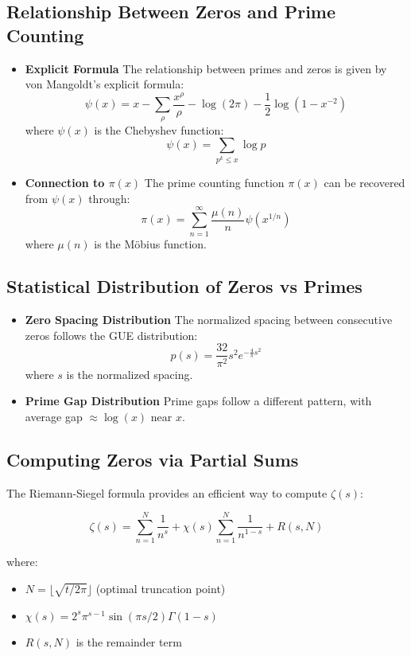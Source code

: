 \documentclass{article}
\begin{document}
\subsection*{Relationship Between Zeros and Prime Counting}

\begin{itemize}
\item \textbf{Explicit Formula}
The relationship between primes and zeros is given by von Mangoldt's explicit formula:
\[ \psi(x) = x - \sum_{\rho} \frac{x^{\rho}}{\rho} - \log(2\pi) - \frac{1}{2}\log(1-x^{-2}) \]
where $\psi(x)$ is the Chebyshev function:
\[ \psi(x) = \sum_{p^k \leq x} \log p \]

\item \textbf{Connection to $\pi(x)$}
The prime counting function $\pi(x)$ can be recovered from $\psi(x)$ through:
\[ \pi(x) = \sum_{n=1}^{\infty} \frac{\mu(n)}{n} \psi(x^{1/n}) \]
where $\mu(n)$ is the Möbius function.
\end{itemize}

\subsection*{Statistical Distribution of Zeros vs Primes}

\begin{itemize}
\item \textbf{Zero Spacing Distribution}
The normalized spacing between consecutive zeros follows the GUE distribution:
\[ p(s) = \frac{32}{\pi^2}s^2e^{-\frac{4}{\pi}s^2} \]
where $s$ is the normalized spacing.

\item \textbf{Prime Gap Distribution}
Prime gaps follow a different pattern, with average gap $\approx \log(x)$ near $x$.
\end{itemize}

\subsection*{Computing Zeros via Partial Sums}

The Riemann-Siegel formula provides an efficient way to compute $\zeta(s)$:

\[ \zeta(s) = \sum_{n=1}^{N} \frac{1}{n^s} + \chi(s)\sum_{n=1}^{N} \frac{1}{n^{1-s}} + R(s,N) \]

where:
\begin{itemize}
\item $N = \lfloor\sqrt{t/2\pi}\rfloor$ (optimal truncation point)
\item $\chi(s) = 2^s\pi^{s-1}\sin(\pi s/2)\Gamma(1-s)$
\item $R(s,N)$ is the remainder term
\end{itemize}
\end{document}
